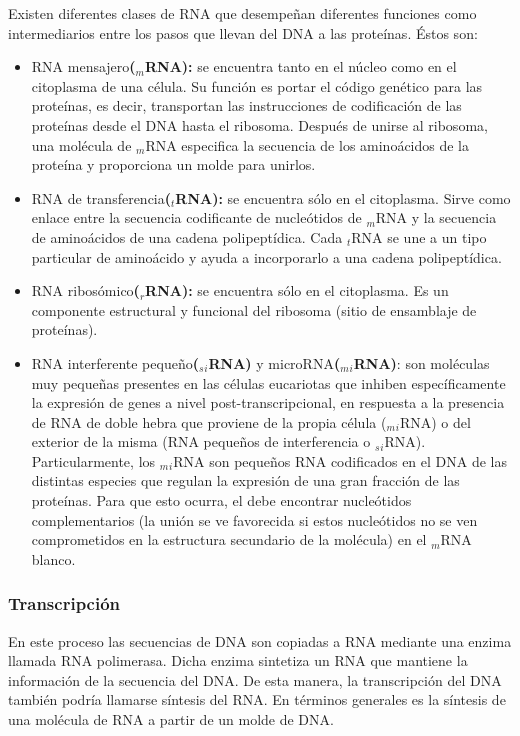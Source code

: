 Existen diferentes clases de RNA que desempeñan diferentes funciones como intermediarios entre los pasos que llevan del DNA a las proteínas. Éstos son:
\begin{itemize}
	\item RNA mensajero\textbf{($_m$RNA):} se encuentra tanto en el núcleo como en el citoplasma de una célula. Su función es portar el código genético para las proteínas, es decir, transportan las instrucciones de codificación de las proteínas desde el DNA hasta el ribosoma. Después de unirse al ribosoma, una molécula de $_m$RNA especifica la secuencia de los aminoácidos de la proteína y proporciona un molde para unirlos.
	\item RNA de transferencia\textbf{($_t$RNA):} se encuentra sólo en el citoplasma. Sirve como enlace entre la secuencia codificante de nucleótidos de $_m$RNA y la secuencia de aminoácidos de una cadena polipeptídica. Cada $_t$RNA se une a un tipo particular de aminoácido y ayuda a incorporarlo a una cadena polipeptídica.
	\item RNA ribosómico\textbf{($_r$RNA):} se encuentra sólo en el citoplasma. Es un componente estructural y funcional del ribosoma (sitio de ensamblaje de proteínas).
	\item RNA interferente pequeño\textbf{($_s$$_i$RNA)} y microRNA\textbf{($_m$$_i$RNA)}: son moléculas muy pequeñas presentes en las células eucariotas que inhiben específicamente la expresión de genes a nivel post-transcripcional, en respuesta a la presencia de RNA de doble hebra que proviene de la propia célula ($_m$$_i$RNA) o del exterior de la misma (RNA pequeños de interferencia o $_s$$_i$RNA). Particularmente, los $_m$$_i$RNA son pequeños RNA codificados en el DNA de las distintas especies que regulan la expresión de una gran fracción de las proteínas. Para que esto ocurra, el debe encontrar nucleótidos complementarios (la unión se ve favorecida si estos nucleótidos no se ven comprometidos en la estructura secundario de la molécula) en el $_m$RNA blanco. %
\end{itemize}

\subsubsection{Transcripción}
En este proceso las secuencias de DNA son copiadas a RNA mediante una enzima llamada RNA polimerasa. Dicha enzima sintetiza un RNA que mantiene la información de la secuencia del DNA. De esta manera, la transcripción del DNA también podría llamarse síntesis del RNA. En términos generales es la síntesis de una molécula de RNA a partir de un molde de DNA.

